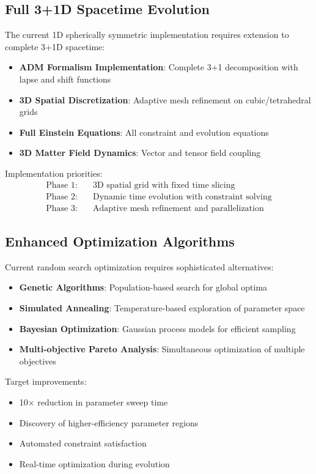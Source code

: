 \documentclass[11pt]{article}
\begin{document}
\subsection{Full 3+1D Spacetime Evolution}

The current 1D spherically symmetric implementation requires extension to complete 3+1D spacetime:

\begin{itemize}
\item \textbf{ADM Formalism Implementation}: Complete 3+1 decomposition with lapse and shift functions
\item \textbf{3D Spatial Discretization}: Adaptive mesh refinement on cubic/tetrahedral grids
\item \textbf{Full Einstein Equations}: All constraint and evolution equations
\item \textbf{3D Matter Field Dynamics}: Vector and tensor field coupling
\end{itemize}

Implementation priorities:
\begin{align}
\text{Phase 1:} &\quad \text{3D spatial grid with fixed time slicing} \\
\text{Phase 2:} &\quad \text{Dynamic time evolution with constraint solving} \\
\text{Phase 3:} &\quad \text{Adaptive mesh refinement and parallelization}
\end{align}

\subsection{Enhanced Optimization Algorithms}

Current random search optimization requires sophisticated alternatives:

\begin{itemize}
\item \textbf{Genetic Algorithms}: Population-based search for global optima
\item \textbf{Simulated Annealing}: Temperature-based exploration of parameter space
\item \textbf{Bayesian Optimization}: Gaussian process models for efficient sampling
\item \textbf{Multi-objective Pareto Analysis}: Simultaneous optimization of multiple objectives
\end{itemize}

Target improvements:
\begin{itemize}
\item 10× reduction in parameter sweep time
\item Discovery of higher-efficiency parameter regions
\item Automated constraint satisfaction
\item Real-time optimization during evolution
\end{itemize}
\end{document}
